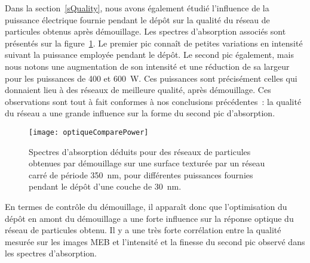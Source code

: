 Dans la section~\ref{sQuality}, nous avons également étudié l'influence de la puissance électrique fournie pendant le dépôt sur la qualité du réseau de particules obtenus après démouillage. Les spectres d'absorption associés sont présentés sur la figure~\ref{optiqueComparePower}. Le premier pic connaît de petites variations en intensité suivant la puissance employée pendant le dépôt. Le second pic également, mais nous notons une augmentation de son intensité et une réduction de sa largeur pour les puissances de 400 et 600~W. Ces puissances sont précisément celles qui donnaient lieu à des réseaux de meilleure qualité, après démouillage. Ces observations sont tout à fait conformes à nos conclusions précédentes~: la qualité du réseau a une grande influence sur la forme du second pic d'absorption.\par  
\begin{figure}[!htb]
\centering
\texttt{[image: optiqueComparePower]}
\caption{Spectres d'absorption déduits pour des réseaux de particules obtenues par démouillage sur une surface texturée par un réseau carré de période 350~nm, pour différentes puissances fournies pendant le dépôt d'une couche de 30~nm.}
\label{optiqueComparePower}
\end{figure}
En termes de contrôle du démouillage, il apparaît donc que l'optimisation du dépôt en amont du démouillage a une forte influence sur la réponse optique du réseau de particules obtenu. Il y a une très forte corrélation entre la qualité mesurée sur les images MEB et l'intensité et la finesse du second pic observé dans les spectres d'absorption.\par 
